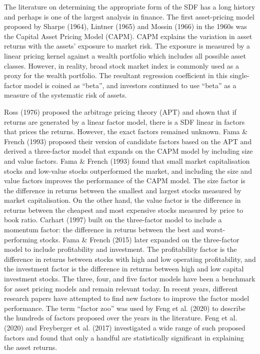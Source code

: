 \documentclass[12pt]{article}
\begin{document}
\thispagestyle{plain}

The literature on determining the appropriate form of the
SDF has a long history and perhaps is one of the largest
analysis in finance. The first asset-pricing model proposed by
Sharpe (1964), Lintner (1965) and
Mossin (1966) in the 1960s was the
Capital Asset Pricing Model (CAPM).
CAPM explains the variation in asset
returns with the assets' exposure to market risk.
The exposure is measured by a linear pricing kernel against
a wealth portfolio which includes all possible asset
classes. However, in reality, broad stock market index is
commonly used as a proxy for the wealth portfolio.
The resultant regression coefficient in this single-factor
model is coined as ``beta'', and investors continued to use
``beta'' as a measure of the systematic risk of assets.

Ross (1976) proposed the arbitrage pricing theory
(APT) and shown that if returns are generated by a linear
factor model, there is a SDF linear in factors that prices
the returns. However, the exact factors remained unknown.
Fama \& French (1993) proposed their version of candidate
factors based on the APT and derived a three-factor model that
expands on the CAPM model by including size and value
factors.
Fama \& French (1993) found that small market capitalisation
stocks and low-value stocks outperformed the market, and
including the size and value factors improves the
performance of the CAPM model.
The size factor is the difference in returns between the
smallest and largest stocks measured by market capitalisation.
On the other hand, the value factor is the difference in
returns between the cheapest and
most expensive stocks measured by price to book ratio.
Carhart (1997) built on the three-factor model
to include a momentum factor: the difference
in returns between the best and worst-performing stocks.
Fama \& French (2015) later expanded on the three-factor model to
include profitability and investment. The profitability
factor is the difference in returns between stocks with high
and low operating profitability, and the investment factor is
the difference in returns between high and low capital
investment stocks. The three, four, and five factor models
have been a benchmark for asset pricing models and
remain relevant today.
In recent years, different research papers have attempted to
find new factors to improve the factor model performance.
The term ``factor zoo'' was used by Feng et al. (2020) to
describe the hundreds of factors proposed over the years in
the literature.
Feng et al. (2020) and Freyberger et al. (2017)
investigated a wide range of such proposed factors and found
that only a handful are
statistically significant in explaining the asset returns.
\end{document}
